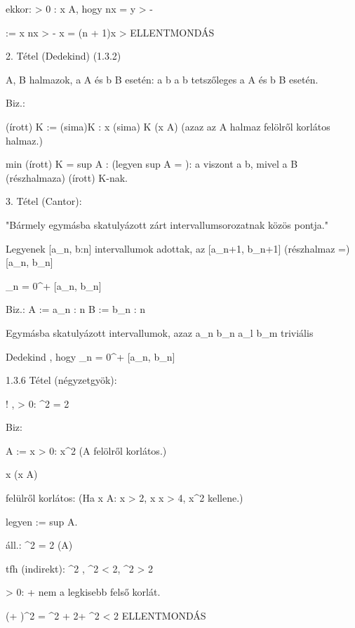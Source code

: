 ekkor:
\exists \epsilon > 0 : \exists x \in A, hogy nx = y > \alpha - \epsilon

\epsilon := x \Rightarrow nx > \aplha - x =
(n + 1)x > \aplha \Rightarrow ELLENTMONDÁS

2. Tétel (Dedekind) (1.3.2)

A, B \neq \emptyset halmazok, \forall a \in A és \forall b \in B esetén:
a \leq b \Rightarrow \exists \gamma \in {}
a \leq \gamma \leq b tetszőleges a \in A és b \in B esetén.

Biz.:

(írott) K := { (sima)K \in {}: x \leq (sima) K (x \in A)} (azaz az A halmaz felölről korlátos halmaz.)

min (írott) K = sup A : (legyen sup A = {\gamma}): a \leq \gamma
viszont a \gamma \leq b, mivel a B (részhalmaza) (írott) K-nak.

3. Tétel (Cantor):

"Bármely egymásba skatulyázott zárt intervallumsorozatnak \exists közös pontja."

Legyenek [a_n, b:n] intervallumok adottak, az [a_{n+1}, b_{n+1}] (részhalmaz =) [a_n, b_n] \Rightarrow

\bigcap_{n = 0}^{+ \infty} [a_n, b_n] \neq \emptyset

Biz.:
A := {a_n : n \in {}}
B := {b_n : n \in {}}

Egymásba skatulyázott intervallumok, azaz a_n \leq b_n
a_l \leq b_m triviális

\Rightarrow Dedekind \Rightarrow \exists \gamma \in {}, hogy \gamma \in \bigcap_{n = 0}^{+ \infty} [a_n, b_n] \neq \emptyset

1.3.6 Tétel (négyzetgyök):

{\exists}! \aphy \in {}, \alpha > 0: \alpha^2 = 2

Biz:

A := { x > 0: x^2  } (A felölről korlátos.)

\forall x 
(x \in A)


felülről korlátos: (Ha \exists x \in A: x > 2, x \cdot x > 4, x^2  kellene.)

legyen \alphy := sup A.

áll.: {\alpha}^2 = 2 (\alpha \in A)


tfh (indirekt):
{\alpha}^2 , {\alpha}^2 < 2, {\alpha}^2 > 2

\exists \epsilon > 0: {\alpha} + {\epsilon} nem a legkisebb felső korlát.

(\aplha + \epsilon)^2 = \alpha^2 + 2\alpha \epsilon + \epsilon^2 < 2 \rightarrow ELLENTMONDÁS


